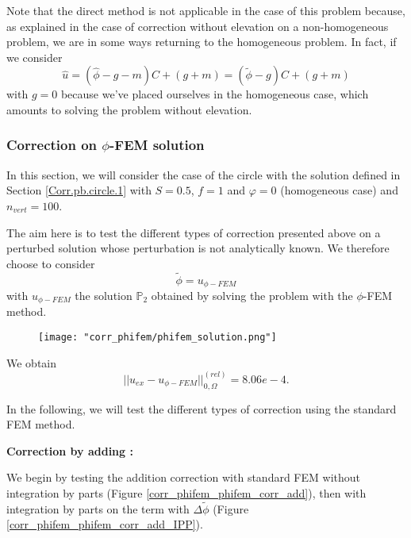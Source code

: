 \begin{Rem}
	Note that the direct method is not applicable in the case of this problem because, as explained in the case of correction without elevation on a non-homogeneous problem, we are in some ways returning to the homogeneous problem. In fact, if we consider 
	\begin{equation*}
		\hat{u}=(\hat{\phi}-g-m)C+(g+m)=(\tilde{\phi}-g)C+(g+m)
	\end{equation*}
	with $g=0$ because we've placed ourselves in the homogeneous case, which amounts to solving the problem without elevation.
\end{Rem}

\subsubsection{Correction on $\phi$-FEM solution} \label{Corr.results.phifem}

In this section, we will consider the case of the circle with the solution defined in Section \ref{Corr.pb.circle.1} with $S=0.5$, $f=1$ and $\varphi=0$ (homogeneous case) and $n_{vert}=100$.

The aim here is to test the different types of correction presented above on a perturbed solution whose perturbation is not analytically known. We therefore choose to consider
\begin{equation*}
	\tilde{\phi}=u_{\phi-FEM}
\end{equation*}
with $u_{\phi-FEM}$ the solution $\mathbb{P}_2$ obtained by solving the problem with the $\phi$-FEM method.

\begin{figure}[H]
	\centering
	\texttt{[image: "corr\_phifem/phifem\_solution.png"]}
	\label{corr_phifem_phifem_solution}
\end{figure} 

We obtain
\begin{equation*}
	||u_{ex}-u_{\phi-FEM}||_{0,\Omega}^{(rel)}=8.06e-4.
\end{equation*}

In the following, we will test the different types of correction using the standard FEM method.

\textbf{Correction by adding :}

We begin by testing the addition correction with standard FEM without integration by parts (Figure \ref{corr_phifem_phifem_corr_add}), then with integration by parts on the term with $\Delta\tilde{\phi}$ (Figure \ref{corr_phifem_phifem_corr_add_IPP}).

